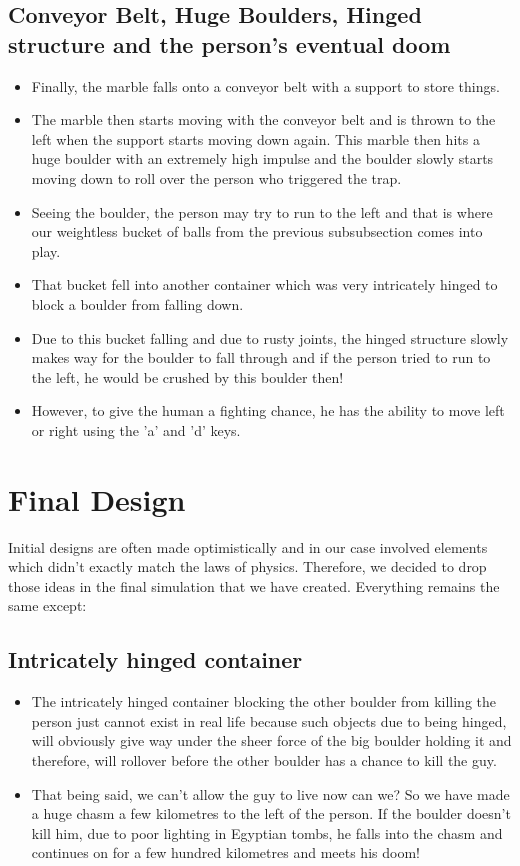 \documentclass[11pt]{article}
\begin{document}
\subsection{Conveyor Belt, Huge Boulders, Hinged structure and the person's eventual doom}
\begin{itemize}
	\item Finally, the marble falls onto a conveyor belt with a support to store things. 
	\item The marble then starts moving with the conveyor belt and is thrown to the left when the support starts moving down again. This marble then hits a huge boulder with an extremely high impulse and the boulder slowly starts moving down to roll over the person who triggered the trap. 
	\item Seeing the boulder, the person may try to run to the left and that is where our weightless bucket of balls from the previous subsubsection comes into play.
	\item That bucket fell into another container which was very intricately hinged to block a boulder from falling down.
	\item Due to this bucket falling and due to rusty joints, the hinged structure slowly makes way for the boulder to fall through and if the person tried to run to the left, he would be crushed by this boulder then!
	\item However, to give the human a fighting chance, he has the ability to move left or right using the 'a' and 'd' keys.
\end{itemize}


\section{Final Design}
Initial designs are often made optimistically and in our case involved elements which didn't exactly match the laws of physics. Therefore, we decided to drop those ideas in the final simulation that we have created. Everything remains the same except:
\subsection{Intricately hinged container}
\begin{itemize}
\item The intricately hinged container blocking the other boulder from killing the person just cannot exist in real life because such objects due to being hinged, will obviously give way under the sheer force of the big boulder holding it and therefore, will rollover before the other boulder has a chance to kill the guy. 
\item That being said, we can't allow the guy to live now can we? So we have made a huge chasm a few kilometres to the left of the person. If the boulder doesn't kill him, due to poor lighting in Egyptian tombs, he falls into the chasm and continues on for a few hundred kilometres and meets his doom! 
\end{itemize}
\end{document}
